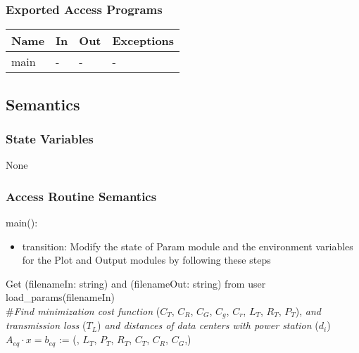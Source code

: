 \documentclass[12pt, titlepage]{article}
\begin{document}
\subsubsection{Exported Access Programs}

\begin{center}
\begin{tabular}{p{2cm} p{4cm} p{4cm} p{2cm}}
\hline
\textbf{Name} & \textbf{In} & \textbf{Out} & \textbf{Exceptions} \\
\hline
main & - & - & - \\
\hline
\end{tabular}
\end{center}

\subsection{Semantics}

\subsubsection{State Variables}

None

\subsubsection{Access Routine Semantics}

\noindent main():
\begin{itemize}
\item transition: Modify the state of Param module and the environment variables
  for the Plot and Output modules by following these steps\\
\end{itemize}

\noindent Get (filenameIn: string) and (filenameOut: string) from user\\

\noindent load\_params(filenameIn)\\

\noindent \#\textit{Find minimization cost function} ($C_T$,
  $C_R$, $C_G$, $C_g$, $C_r$, $L_T$, $R_T$, $P_T$), \textit{and transmission loss} ($T_L$) \textit{and distances of data centers with power station} ($d_i$)\\

\noindent $A_{eq} \cdot x = b_{eq}$ := (, $L_T$,
$P_T$, $R_T$, $C_T$, $C_R$, $C_G$,)\\
\end{document}
